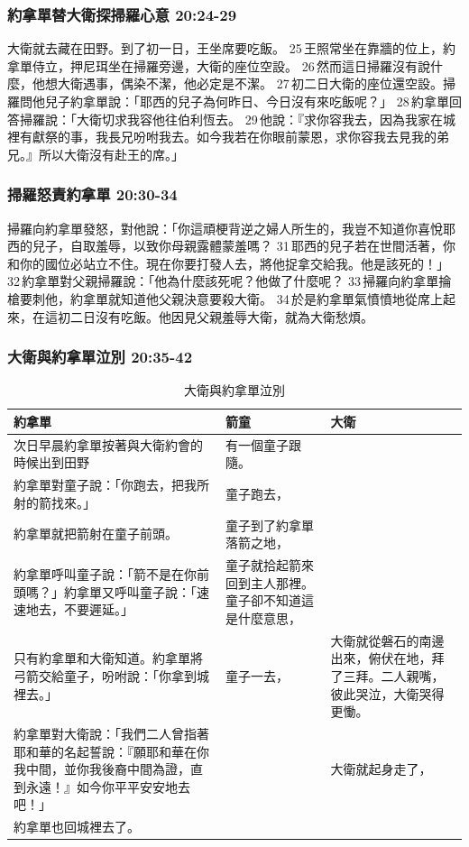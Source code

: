 \subsubsection{約拿單替大衛探掃羅心意 20:24-29}
大衛就去藏在田野。到了初一日，王坐席要吃飯。 25 王照常坐在靠牆的位上，約拿單侍立，押尼珥坐在掃羅旁邊，大衛的座位空設。 26 然而這日掃羅沒有說什麼，他想大衛遇事，偶染不潔，他必定是不潔。 27 初二日大衛的座位還空設。掃羅問他兒子約拿單說：「耶西的兒子為何昨日、今日沒有來吃飯呢？」 28 約拿單回答掃羅說：「大衛切求我容他往伯利恆去。 29 他說：『求你容我去，因為我家在城裡有獻祭的事，我長兄吩咐我去。如今我若在你眼前蒙恩，求你容我去見我的弟兄。』所以大衛沒有赴王的席。」


\subsubsection{掃羅怒責約拿單 20:30-34}
掃羅向約拿單發怒，對他說：「你這頑梗背逆之婦人所生的，我豈不知道你喜悅耶西的兒子，自取羞辱，以致你母親露體蒙羞嗎？ 31 耶西的兒子若在世間活著，你和你的國位必站立不住。現在你要打發人去，將他捉拿交給我。他是該死的！」 32 約拿單對父親掃羅說：「他為什麼該死呢？他做了什麼呢？ 33 掃羅向約拿單掄槍要刺他，約拿單就知道他父親決意要殺大衛。 34 於是約拿單氣憤憤地從席上起來，在這初二日沒有吃飯。他因見父親羞辱大衛，就為大衛愁煩。

\subsubsection{大衛與約拿單泣別 20:35-42}
\begin{table}[H]
\centering 
\begin{tabular}{p{7.5cm}|p{4.75cm}|p{4.5cm}}\hline\hline
約拿單&箭童&大衛\\\hline
次日早晨約拿單按著與大衛約會的時候出到田野&有一個童子跟隨。&\\\hline
約拿單對童子說：「你跑去，把我所射的箭找來。」&童子跑去，& \\\hline
約拿單就把箭射在童子前頭。&童子到了約拿單落箭之地，& \\\hline
約拿單呼叫童子說：「箭不是在你前頭嗎？」約拿單又呼叫童子說：「速速地去，不要遲延。」 &童子就拾起箭來回到主人那裡。童子卻不知道這是什麼意思，& \\\hline
只有約拿單和大衛知道。約拿單將弓箭交給童子，吩咐說：「你拿到城裡去。」&童子一去，&大衛就從磐石的南邊出來，俯伏在地，拜了三拜。二人親嘴，彼此哭泣，大衛哭得更慟。 \\\hline
約拿單對大衛說：「我們二人曾指著耶和華的名起誓說：『願耶和華在你我中間，並你我後裔中間為證，直到永遠！』如今你平平安安地去吧！」&&大衛就起身走了， \\\hline
約拿單也回城裡去了。&&\\\hline
\end{tabular}
\caption{大衛與約拿單泣別}
\end{table}


